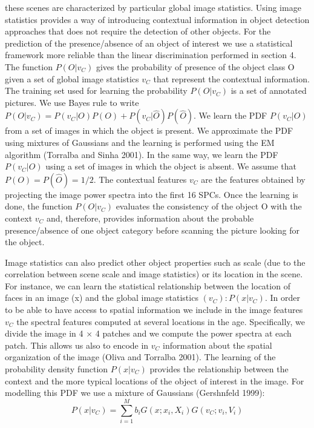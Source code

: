 \documentclass{article}
\begin{document}
these scenes are characterized by particular global image statistics.
Using image statistics provides a way of introducing contextual information in object detection approaches that does not require the detection of other objects. For the prediction of
the presence/absence of an object of interest we use a statistical framework more reliable than the linear discrimination performed in section 4. The function $P(O| v_C)$ gives the probability
of presence of the object class O given a set of global image statistics $v_C$ that represent the
contextual information.
The training set used for learning the probability $P(O|v_C)$ is a set of annotated pictures. We use Bayes rule to write $P(O|v_C)  = P(v_C|O)P(O) + P(v_C|\hat{O})P(\hat{O})$. We learn the PDF $P(v_C|O)$ from a set of images in which the object is present. We approximate the PDF using
mixtures of Gaussians and the learning is performed using the EM algorithm (Torralba and Sinha 2001). In the same way, we learn the PDF $P(v_C|O)$ using a set of images in which
the object is absent. We assume that $P(O) = P(\hat{O}) = 1/2$. The contextual features $v_C$ are the features obtained by projecting the image power spectra into the first 16 SPCs. Once the learning is done, the function $P(O|v_C)$ evaluates the consistency of the object O with the context $v_C$ and, therefore, provides information about the probable presence/absence of one object category before scanning the picture looking for the object.

Image statistics can also predict other object properties such as scale (due to the correlation between scene scale and image statistics) or its location in the scene. For instance, we can learn the statistical relationship between the location of faces in an image (x) and the global
image statistics $(v_C):P(x|v_C)$. In order to be able to have access to spatial information we include in the image features $v_C$ the spectral features computed at several locations in the age. Specifically, we divide the image in 4 $\times$ 4 patches and we compute the power spectra at each patch. This allows us also to encode in $v_C$ information about the spatial organization of the image (Oliva and Torralba 2001).
The learning of the probability density function $P(x|v_C)$ provides the relationship between the context and the more typical locations of the object of interest in the image. For modelling
this PDF we use a mixture of Gaussians (Gershnfeld 1999):
\begin{equation}
    P(x|v_C) = \sum^M_{i=1}b_i G(x;x_i,X_i)G(v_C;v_i,V_i)
\end{equation}
\end{document}
